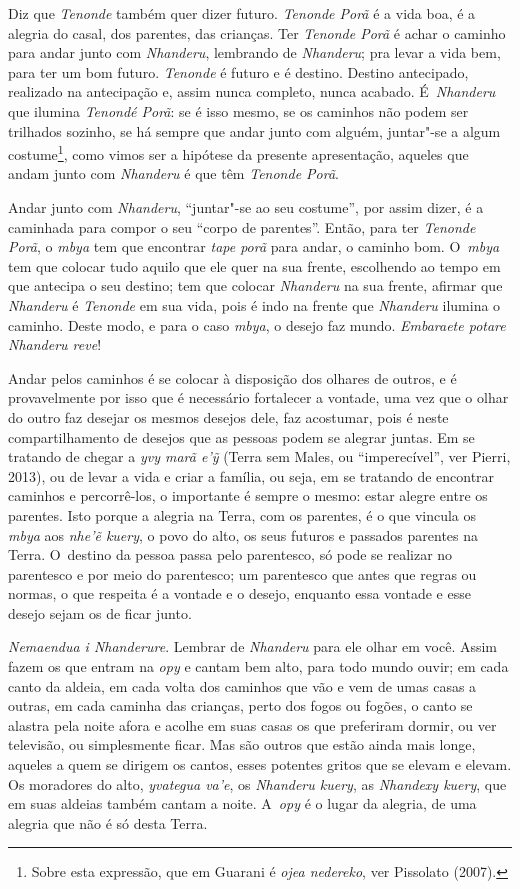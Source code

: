 Diz que \emph{Tenonde} também quer dizer futuro. \emph{Tenonde Porã} é a vida boa, é a
alegria do casal, dos parentes, das crianças. Ter \emph{Tenonde Porã} é achar
o caminho para andar junto com \emph{Nhanderu}, lembrando de \emph{Nhanderu}; pra
levar a vida bem, para ter um bom futuro. \emph{Tenonde} é futuro e é destino.
Destino antecipado, realizado na antecipação e, assim nunca completo,
nunca acabado. É~\emph{Nhanderu} que ilumina \emph{Tenondé Porã}: se é isso mesmo, se
os caminhos não podem ser trilhados sozinho, se há sempre que andar
junto com alguém, juntar"-se a algum costume\footnote{Sobre esta
expressão, que em Guarani é \emph{ojea nedereko}, ver Pissolato (2007).},
como vimos ser a hipótese da presente apresentação, aqueles que andam
junto com \emph{Nhanderu} é que têm \emph{Tenonde Porã}.

Andar junto com \emph{Nhanderu}, ``juntar"-se ao seu costume'', por assim dizer, é
a caminhada para compor o seu ``corpo de parentes''. Então, para ter
\emph{Tenonde Porã}, o \emph{mbya} tem que encontrar \emph{tape porã} para andar, o caminho
bom. O~\emph{mbya} tem que colocar tudo aquilo que ele quer na sua frente,
escolhendo ao tempo em que antecipa o seu destino; tem que colocar
\emph{Nhanderu} na sua frente, afirmar que \emph{Nhanderu} é \emph{Tenonde} em sua vida,
pois é indo na frente que \emph{Nhanderu} ilumina o caminho. Deste modo, e
para o caso \emph{mbya}, o desejo faz mundo. \emph{Embaraete potare Nhanderu reve}!

Andar pelos caminhos é se colocar à disposição dos olhares de outros, e
é provavelmente por isso que é necessário fortalecer a vontade, uma vez
que o olhar do outro faz desejar os mesmos desejos dele, faz acostumar,
pois é neste compartilhamento de desejos que as pessoas podem se
alegrar juntas. Em se tratando de chegar a \emph{yvy marã e’ỹ} (Terra sem
Males, ou ``imperecível'', ver Pierri, 2013), ou de levar a vida e criar
a família, ou seja, em se tratando de encontrar caminhos e
percorrê-los, o importante é sempre o mesmo: estar alegre entre os
parentes. Isto porque a alegria na Terra, com os parentes, é o que
vincula os \emph{mbya} aos \emph{nhe’ẽ kuery}, o povo do alto, os seus futuros
e passados parentes na Terra. O~destino da pessoa passa pelo
parentesco, só pode se realizar no parentesco e por meio do parentesco;
um parentesco que antes que regras ou normas, o que respeita é a
vontade e o desejo, enquanto essa vontade e esse desejo sejam os de
ficar junto. 

\emph{Nemaendua i Nhanderure}. Lembrar de \emph{Nhanderu} para ele olhar em você.
Assim fazem os que entram na \emph{opy} e cantam bem alto, para todo mundo
ouvir; em cada canto da aldeia, em cada volta dos caminhos que vão e
vem de umas casas a outras, em cada caminha das crianças, perto dos
fogos ou fogões, o canto se alastra pela noite afora e acolhe em suas
casas os que preferiram dormir, ou ver televisão, ou simplesmente
ficar. Mas são outros que estão ainda mais longe, aqueles a quem se
dirigem os cantos, esses potentes gritos que se elevam e elevam. Os
moradores do alto, \emph{yvategua va’e}, os \emph{Nhanderu kuery}, as \emph{Nhandexy kuery},
que em suas aldeias também cantam a noite. A~\emph{opy} é o lugar da alegria,
de uma alegria que não é só desta Terra. 

